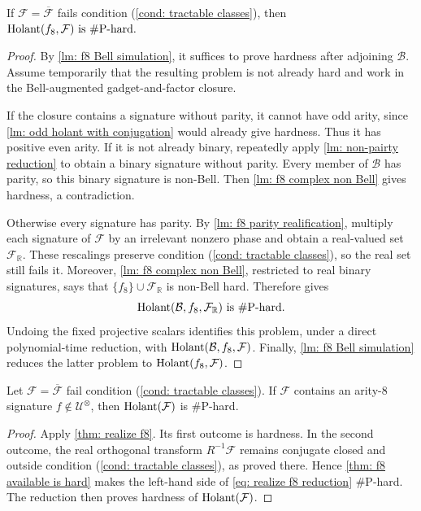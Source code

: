 \begin{theorem}
\label{thm: f8 available is hard}
If $\mathcal F=\overline{\mathcal F}$ fails condition
\rm{(\ref{cond: tractable classes})}, then
\(
 \operatorname{Holant}(f_8,\mathcal F)\text{ is \#P-hard}.
\)
\end{theorem}

\begin{proof}
By \cref{lm: f8 Bell simulation}, it suffices to prove hardness after
adjoining $\mathcal B$.  Assume temporarily that the resulting problem is
not already hard and work in the Bell-augmented gadget-and-factor closure.

If the closure contains a signature without parity, it cannot have odd
arity, since \cref{lm: odd holant with conjugation} would already give
hardness.  Thus it has positive even arity.  If it is not already binary,
repeatedly apply \cref{lm: non-pairty reduction} to obtain a binary
signature without parity.  Every member of $\mathcal B$ has parity, so
this binary signature is non-Bell.  Then
\cref{lm: f8 complex non Bell} gives hardness, a contradiction.

Otherwise every signature has parity.  By
\cref{lm: f8 parity realification}, multiply each signature of
$\mathcal F$ by an irrelevant nonzero phase and obtain a real-valued set
$\mathcal F_{\mathbb R}$.  These rescalings preserve condition
\rm{(\ref{cond: tractable classes})}, so the real set still fails it.
Moreover, \cref{lm: f8 complex non Bell}, restricted to real binary
signatures, says that $\{f_8\}\cup\mathcal F_{\mathbb R}$ is non-Bell
hard.  Therefore \cite[Theorem~7.19]{realholant} gives
\[
 \operatorname{Holant}(\mathcal B,f_8,\mathcal F_{\mathbb R})
 \text{ is \#P-hard}.
\]
Undoing the fixed projective scalars identifies this problem, under a
direct polynomial-time reduction, with
$\operatorname{Holant}(\mathcal B,f_8,\mathcal F)$.  Finally,
\cref{lm: f8 Bell simulation} reduces the latter problem to
$\operatorname{Holant}(f_8,\mathcal F)$.
\end{proof}

\begin{theorem}
\label{thm: base case 2n=8}
Let $\mathcal F=\overline{\mathcal F}$ fail condition
\rm{(\ref{cond: tractable classes})}.  If $\mathcal F$ contains an
arity-$8$ signature $f\notin\mathcal U^{\otimes}$, then
$\operatorname{Holant}(\mathcal F)$ is \#P-hard.
\end{theorem}

\begin{proof}
Apply \cref{thm: realize f8}.  Its first outcome is hardness.  In the
second outcome, the real orthogonal transform $R^{-1}\mathcal F$ remains
conjugate closed and outside condition
\rm{(\ref{cond: tractable classes})}, as proved there.  Hence
\cref{thm: f8 available is hard} makes the left-hand side of
\eqref{eq: realize f8 reduction} \#P-hard.  The reduction then proves
hardness of $\operatorname{Holant}(\mathcal F)$.
\end{proof}
